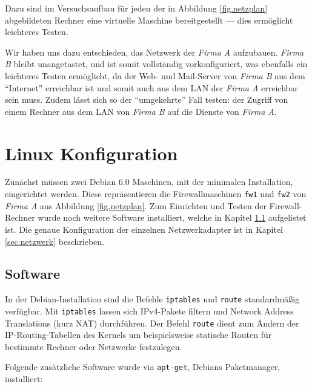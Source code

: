 Dazu sind im Versuchsaufbau für jeden der in Abbildung 
\ref{fig.netzplan} abgebildeten Rechner
eine virtuelle Maschine bereitgestellt --- dies ermöglicht leichteres
Testen.

Wir haben uns dazu entschieden, das Netzwerk der \emph{Firma A} aufzubauen.
\emph{Firma B} bleibt unangetastet, und ist somit vollständig vorkonfiguriert,
was ebenfalls ein leichteres Testen ermöglicht, da der Web- und Mail-Server von
\emph{Firma B} aus dem "`Internet"' erreichbar ist und somit auch aus dem LAN
der \emph{Firma A} erreichbar sein muss.
Zudem lässt sich so der "`umgekehrte"' Fall testen: der Zugriff von einem
Rechner aus dem LAN von \emph{Firma B} auf die Dienste von
\emph{Firma A}.\cite{labor}


\section{Linux Konfiguration}

Zunächst müssen zwei Debian 6.0 Maschinen,
mit der minimalen Installation, eingerichtet werden.
Diese repräsentieren die Firewallmaschinen {\tt fw1} und {\tt fw2} von
\emph{Firma A} aus Abbildung \ref{fig.netzplan}.
Zum Einrichten und Testen der Firewall-Rechner wurde noch weitere Software
installiert, welche in Kapitel \ref{sec.software} aufgelistet ist.
Die genaue Konfiguration der einzelnen Netzwerkadapter ist in Kapitel
\ref{sec.netzwerk} beschrieben.


\subsection{Software}\label{sec.software}

In der Debian-Installation sind die Befehle {\tt iptables} und {\tt route}
standardmäßig verfügbar.
Mit {\tt iptables} lassen sich IPv4-Pakete filtern und Network Address
Translations (kurz NAT) durchführen.
Der Befehl {\tt route} dient zum Ändern der IP-Routing-Tabellen des Kernels um
beispielsweise statische Routen für bestimmte Rechner oder Netzwerke
festzulegen.

Folgende zusätzliche Software wurde via {\tt apt-get}, Debians Paketmanager,
installiert:

